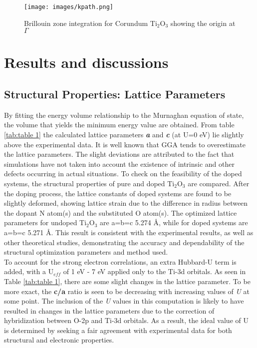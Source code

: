 \documentclass[aps,prb,superscriptaddress,twocolumn,floatfix,showpacs,amsmath]{revtex4-1}
\begin{document}
\begin{figure}
    \centering
    \texttt{[image: images/kpath.png]}
    \caption{Brillouin zone integration for  Corundum Ti$_{2}$O$_{3}$ showing the origin at $\Gamma$}
    \label{fig:1}
\end{figure}

\section{Results and discussions}

\subsection{Structural Properties: Lattice Parameters}

By fitting the energy volume relationship to the Murnaghan equation of state\cite{murnaghan1944compressibility}, the volume that yields the minimum energy value are obtained. From table \ref{tab:table 1} the calculated lattice parameters \textbf{\textit a} and \textbf{\textit c } (at U=0 eV) lie slightly above the  experimental data\cite{li2018titanium}. It is well known that GGA tends to overestimate the lattice parameters\cite{niu2011enhanced}. The slight deviations are attributed to the fact that simulations have not taken into account the existence of intrinsic and other defects occurring in actual situations. To check on the feasibility of the doped systems, the structural properties of pure and doped Ti$_{2}$O$_{3}$ are compared. After the doping process, the lattice constants of doped systems are found to be slightly deformed, showing lattice strain due to the difference in radius between the dopant N atom(s) and the substituted O atom(s). The optimized lattice parameters for undoped Ti$_{2}$O$_{3}$ are a=b=c 5.274 Å, while for doped systems are a=b=c 5.271 Å. This result is consistent with the experimental results\cite{li2018titanium}, as well as other theoretical studies\cite{aoki2019insulating}, demonstrating the accuracy and dependability of the structural optimization parameters and method used.
\\
To account for the strong electron correlations, an extra Hubbard-U term is added, with a U\textit{$_{eff}$} of 1 eV - 7 eV applied only to the Ti-3d orbitals. As seen in Table \ref{tab:table 1}, there are some slight changes in the lattice parameter. To be more exact, the \textbf{c/a} ratio is seen to be decreasing with increasing values of \textit{U} at some point. The inclusion of the \textit{U} values in this computation is likely to have resulted in changes in the lattice parameters due to the correction of hybridization between O-2p and Ti-3d orbitals\cite{persson2006improved}. As a result, the ideal value of U is determined by seeking a fair agreement with experimental data for both structural and electronic properties.
\end{document}
